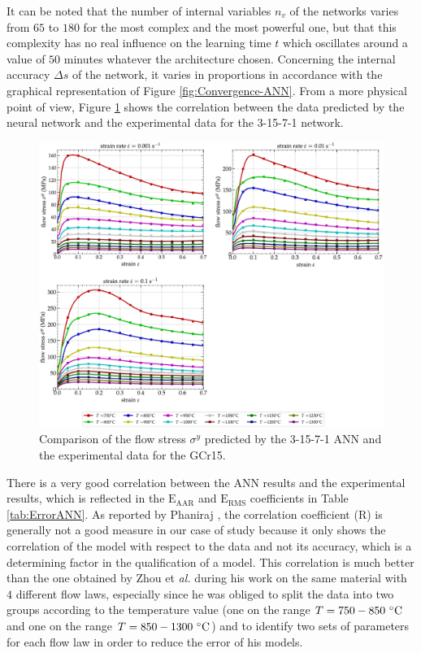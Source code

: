 \documentclass[algorithms,article,submit,pdftex,moreauthors]{Definitions/mdpi}
\makeatletter
\DeclareRobustCommand{\eal}{et \emph{al.}\@\xspace}
\DeclareRobustCommand{\RMSE}{\text{E}_\text{RMS}}
\DeclareRobustCommand{\AARE}{\text{E}_\text{AAR}}
\DeclareRobustCommand{\R}{\text{R}}
\makeatother
\begin{document}
It can be noted that the number of internal variables $n_v$ of the networks varies from $65$ to $180$ for the most complex and the most powerful one, but that this complexity has no real influence on the learning time $t$ which oscillates around a value of $50$ minutes whatever the architecture chosen. 
Concerning the internal accuracy $\Delta s$ of the network, it varies in proportions in accordance with the graphical representation of Figure \ref{fig:Convergence-ANN}. 
From a more physical point of view, Figure \ref{fig:CompExpANN} shows the correlation between the data predicted by the neural network and the experimental data for the 3-15-7-1 network. 
\begin{figure}[!ht]
\centering
\includegraphics[width=\columnwidth]{Figures/CompExpANN-3-15-7-1}
\caption{Comparison of the flow stress $\sigma^y$ predicted by the 3-15-7-1 ANN and the experimental data for the GCr15.}
\label{fig:CompExpANN}
\end{figure}
There is a very good correlation between the ANN results and the experimental results, which is reflected in the $\AARE$ and $\RMSE$ coefficients in Table \ref{tab:ErrorANN}. 
As reported by Phaniraj \cite{Phaniraj-2003}, the correlation coefficient ($\R$) is generally not a good measure in our case of study because it only shows the correlation of the model with respect to the data and not its accuracy, which is a determining factor in the qualification of a model.
This correlation is much better than the one obtained by Zhou \eal \cite{Zhou-2019} during his work on the same material with $4$ different flow laws, especially since he was obliged to split the data into two groups according to the temperature value (one on the range $T=750-850~\celsius$ and one on the range $T=850-1300~\celsius$) and to identify two sets of parameters for each flow law in order to reduce the error of his models. 
\end{document}
